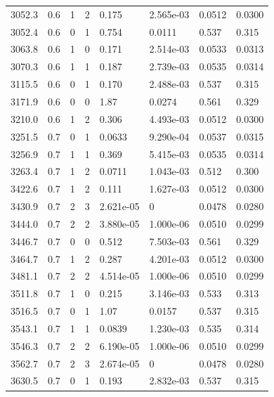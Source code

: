 \documentclass[preview]{standalone}
\begin{document}
{{{\begin{tabular}{L{1.2cm}C{1.2cm} C{0.3cm}C{0.5cm} C{1.4cm}C{1.4cm} C{1.4cm}C{1.4cm}}
  3052.3  &   0.6  & 1     &  2 &  0.175  & 2.565e-03  & 0.0512 &  0.0300   \\ 
  3052.4  &   0.6  & 0     &  1 &  0.754  & 0.0111  & 0.537 &  0.315   \\ 
  3063.8  &   0.6  & 1     &  0 &  0.171  & 2.514e-03  & 0.0533 &  0.0313   \\ 
  3070.3  &   0.6  & 1     &  1 &  0.187  & 2.739e-03  & 0.0535 &  0.0314   \\ 
  3115.5  &   0.6  & 0     &  1 &  0.170  & 2.488e-03  & 0.537 &  0.315   \\ 
  3171.9  &   0.6  & 0     &  0 &  1.87  & 0.0274  & 0.561 &  0.329   \\ 
  3210.0  &   0.6  & 1     &  2 &  0.306  & 4.493e-03  & 0.0512 &  0.0300   \\ 
  3251.5  &   0.7  & 0     &  1 &  0.0633  & 9.290e-04  & 0.0537 &  0.0315   \\ 
  3256.9  &   0.7  & 1     &  1 &  0.369  & 5.415e-03  & 0.0535 &  0.0314   \\ 
  3263.4  &   0.7  & 1     &  2 &  0.0711  & 1.043e-03  & 0.512 &  0.300   \\ 
  3422.6  &   0.7  & 1     &  2 &  0.111  & 1.627e-03  & 0.0512 &  0.0300   \\ 
  3430.9  &   0.7  & 2     &  3 &  2.621e-05  & 0  & 0.0478 &  0.0280   \\ 
  3444.0  &   0.7  & 2     &  2 &  3.880e-05  & 1.000e-06  & 0.0510 &  0.0299   \\ 
  3446.7  &   0.7  & 0     &  0 &  0.512  & 7.503e-03  & 0.561 &  0.329   \\ 
  3464.7  &   0.7  & 1     &  2 &  0.287  & 4.201e-03  & 0.0512 &  0.0300   \\ 
  3481.1  &   0.7  & 2     &  2 &  4.514e-05  & 1.000e-06  & 0.0510 &  0.0299   \\ 
  3511.8  &   0.7  & 1     &  0 &  0.215  & 3.146e-03  & 0.533 &  0.313   \\ 
  3516.5  &   0.7  & 0     &  1 &  1.07  & 0.0157  & 0.537 &  0.315   \\ 
  3543.1  &   0.7  & 1     &  1 &  0.0839  & 1.230e-03  & 0.535 &  0.314   \\ 
  3546.3  &   0.7  & 2     &  2 &  6.190e-05  & 1.000e-06  & 0.0510 &  0.0299   \\ 
  3562.7  &   0.7  & 2     &  3 &  2.674e-05  & 0  & 0.0478 &  0.0280   \\ 
  3630.5  &   0.7  & 0     &  1 &  0.193  & 2.832e-03  & 0.537 &  0.315   \\ 

\end{tabular}}}}
\end{document}
